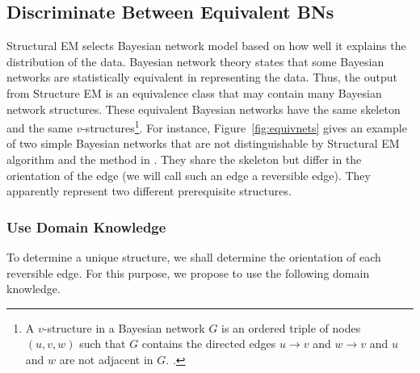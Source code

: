 \documentclass{edm_template}
\begin{document}
\subsection{Discriminate Between Equivalent BNs}
\label{sec:discriminatebns}
Structural EM selects Bayesian network model based on how well it explains the distribution of the data. 
Bayesian network theory states that some Bayesian networks are statistically equivalent in representing the data.
Thus, the output from Structure EM is an equivalence class that may contain many Bayesian network structures.
These equivalent Bayesian networks have the same skeleton and the same $v$-structures\footnote{
A $v$-structure in a Bayesian network $G$ is an ordered triple of nodes $(u,v,w)$ such that $G$ contains the directed edges $u\rightarrow v$ and $w\rightarrow v$ and $u$ and $w$ are not adjacent in $G$. \cite{verma1990equivalence}.}. 
For instance, Figure~\ref{fig:equivnets} gives an example of two simple Bayesian networks that are not distinguishable by Structural EM algorithm and the method in \cite{scheines2014discovering}.
They share the skeleton but differ in the orientation of the edge (we will call such an edge a reversible edge). They apparently represent two different prerequisite structures.

\subsubsection{Use Domain Knowledge}
\label{sec:usedomain}
To determine a unique structure, we shall determine the orientation of each reversible edge.
For this purpose, we propose to use the following domain knowledge.
\end{document}
